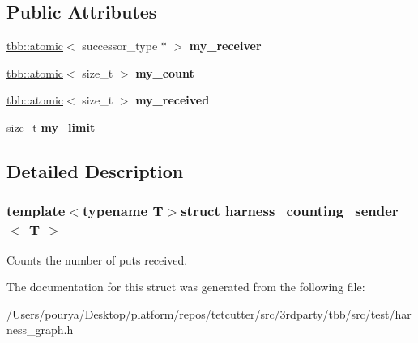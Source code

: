 \subsection*{Public Attributes}
\begin{DoxyCompactItemize}
\item 
\hypertarget{structharness__counting__sender_a3675486ad2d706e8a94c544f343bf2bc}{}\hyperlink{structtbb_1_1atomic}{tbb\+::atomic}$<$ successor\+\_\+type $\ast$ $>$ {\bfseries my\+\_\+receiver}\label{structharness__counting__sender_a3675486ad2d706e8a94c544f343bf2bc}

\item 
\hypertarget{structharness__counting__sender_ab56684e3e1651d590d3f80df141b86c0}{}\hyperlink{structtbb_1_1atomic}{tbb\+::atomic}$<$ size\+\_\+t $>$ {\bfseries my\+\_\+count}\label{structharness__counting__sender_ab56684e3e1651d590d3f80df141b86c0}

\item 
\hypertarget{structharness__counting__sender_a11384c3161f511b23e4680801a9733e0}{}\hyperlink{structtbb_1_1atomic}{tbb\+::atomic}$<$ size\+\_\+t $>$ {\bfseries my\+\_\+received}\label{structharness__counting__sender_a11384c3161f511b23e4680801a9733e0}

\item 
\hypertarget{structharness__counting__sender_a44005b4fd5333d2dfee7bba98c153855}{}size\+\_\+t {\bfseries my\+\_\+limit}\label{structharness__counting__sender_a44005b4fd5333d2dfee7bba98c153855}

\end{DoxyCompactItemize}


\subsection{Detailed Description}
\subsubsection*{template$<$typename T$>$struct harness\+\_\+counting\+\_\+sender$<$ T $>$}

Counts the number of puts received. 

The documentation for this struct was generated from the following file\+:\begin{DoxyCompactItemize}
\item 
/\+Users/pourya/\+Desktop/platform/repos/tetcutter/src/3rdparty/tbb/src/test/harness\+\_\+graph.\+h\end{DoxyCompactItemize}
